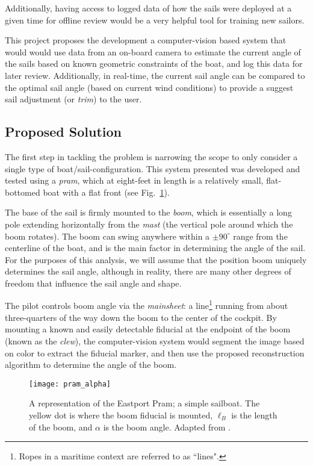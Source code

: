 \documentclass[letterpaper, 10 pt, conference]{ieeeconf}  %
\begin{document}
Additionally, having access to logged data of how the sails were deployed at a given time for offline review would be a very helpful tool for training new sailors. 

This project proposes the development a computer-vision based system that would would use data from an on-board camera to estimate the current angle of the sails based on known geometric constraints of the boat, and log this data for later review. Additionally, in real-time, the current sail angle can be compared to the optimal sail angle (based on current wind conditions) to provide a suggest sail adjustment (or \emph{trim}) to the user. 

\subsection{Proposed Solution}
The first step in tackling the problem is narrowing the scope to only consider a single type of boat/sail-configuration. This system presented was developed and tested using a \emph{pram}, which at eight-feet in length is a relatively small, flat-bottomed boat with a flat front (see Fig.~\ref{fig:pram}).

The base of the sail is firmly mounted to the \emph{boom}, which is essentially a long pole extending horizontally from the \emph{mast} (the vertical pole around which the boom rotates). The boom can swing anywhere within a $\pm 90^\circ$ range from the centerline of the boat, and is the main factor in determining the angle of the sail. For the purposes of this analysis, we will assume that the position boom uniquely determines the sail angle, although in reality, there are many other degrees of freedom that influence the sail angle and shape.

 The pilot controls boom angle via the \emph{mainsheet}: a line\footnote{Ropes in a maritime context are referred to as ``lines".} running from about three-quarters of the way down the boom to the center of the cockpit. By mounting a known and easily detectable fiducial at the endpoint of the boom (known as the \emph{clew}), the computer-vision system would segment the image based on color to extract the fiducial marker, and then use the proposed reconstruction algorithm to determine the angle of the boom.
 
\begin{figure}[htbp]
   \centering
   \texttt{[image: pram\_alpha]} 
   \caption{A representation of the Eastport Pram; a simple sailboat. The yellow dot is where the boom fiducial is mounted, $\ell_B$ is the length of the boom, and $\alpha$ is the boom angle. Adapted from \cite{clc:pram}.}
   \label{fig:pram}
\end{figure}
\end{document}
